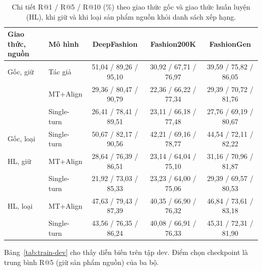 \begin{table}[h]
\centering
\caption{Chi tiết R@1 / R@5 / R@10 (\%) theo giao thức gốc và giao thức huấn luyện (HL), khi giữ và khi loại sản phẩm nguồn khỏi danh sách xếp hạng.}
\label{tab:train-detail}
\footnotesize
\setlength{\tabcolsep}{4pt}
\begin{tabular}{llccc}
\toprule
Giao thức, nguồn & Mô hình & DeepFashion & Fashion200K & FashionGen \\
\midrule
Gốc, giữ & Tác giả & 51,04 / 89,26 / 95,10 & 30,92 / 67,71 / 76,97 & 39,59 / 75,82 / 86,05 \\
               & MT+Align & 29,36 / 80,47 / 90,79 & 22,36 / 66,22 / 77,34 & 29,39 / 70,72 / 81,76 \\
               & Single-turn & 26,41 / 78,41 / 89,51 & 23,11 / 66,18 / 77,48 & 27,76 / 69,19 / 80,67 \\
Gốc, loại & Single-turn & 50,67 / 82,17 / 90,56 & 42,21 / 69,16 / 78,77 & 44,54 / 72,11 / 82,22 \\
\midrule
HL, giữ & MT+Align & 28,64 / 76,39 / 86,51 & 23,14 / 64,04 / 75,10 & 31,16 / 70,96 / 81,87 \\
                      & Single-turn & 21,92 / 73,03 / 85,33 & 23,23 / 64,00 / 75,06 & 29,39 / 69,57 / 80,53 \\
HL, loại & MT+Align & 47,63 / 79,43 / 87,39 & 40,35 / 66,90 / 76,32 & 46,84 / 73,61 / 83,18 \\
                       & Single-turn & 43,56 / 76,35 / 86,24 & 40,08 / 66,91 / 76,33 & 45,31 / 72,31 / 81,90 \\
\bottomrule
\end{tabular}
\end{table}

Bảng~\ref{tab:train-dev} cho thấy diễn biến trên tập dev. Điểm chọn checkpoint là trung bình R@5 (giữ sản phẩm nguồn) của ba bộ.

